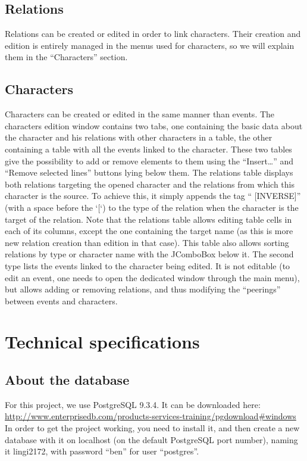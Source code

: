 \documentclass[a4paper ,12pt,french]{article}
\begin{document}
\subsection*{Relations}

Relations can be created or edited in order to link characters. Their creation and edition is entirely managed in the menus used for characters, so we will explain them in the “Characters” section.

\subsection{Characters}

Characters can be created or edited in the same manner than events.
The characters edition window contains two tabs, one containing the basic data about the character and his relations with other characters in a table, the other containing a table with all the events linked to the character. These two tables give the possibility to add or remove elements to them using the “Insert…” and “Remove selected lines” buttons lying below them.
The relations table displays both relations targeting the opened character and the relations from which this character is the source. To achieve this, it simply appends the tag “ [INVERSE]” (with a space before the ‘[‘) to the type of the relation  when the character is the target of the relation.  Note that the relations table allows editing table cells in each of its columns, except the one containing the target name (as this is more new relation creation than edition in that case). This table also allows sorting relations by type or character name with the JComboBox below it. 
The second type lists the events linked to the character being edited. It is not editable (to edit an event, one needs to open the dedicated window through the main menu), but allows adding or removing relations, and thus modifying the “peerings” between events and characters.


\section{Technical specifications }

\subsection{About the database}

For this project, we use PostgreSQL 9.3.4. It can be downloaded here: \url{http://www.enterprisedb.com/products-services-training/pgdownload#windows}
In order to get the project working, you need to install it, and then create a new database with it on localhost (on the default PostgreSQL port number), naming it lingi2172, with password “ben” for user “postgres”.
\end{document}
